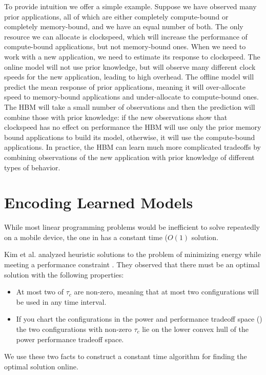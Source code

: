To provide intuition we offer a simple example.  Suppose we have
observed many prior applications, all of which are either completely
compute-bound or completely memory-bound, and we have an equal number
of both.  The only resource we can allocate is clockspeed, which will
increase the performance of compute-bound applications, but not
memory-bound ones.  When we need to work with a new application, we
need to estimate its response to clockspeed.  The online model will
not use prior knowledge, but will observe many different clock speeds
for the new application, leading to high overhead.  The offline model
will predict the mean response of prior applications, meaning it will
over-allocate speed to memory-bound applications and under-allocate to
compute-bound ones.  The HBM will take a small number of observations
and then the prediction will combine those with prior knowledge: if
the new observations show that clockspeed has no effect on performance
the HBM will use only the prior memory bound applications to build its
model, otherwise, it will use the compute-bound applications.  In
practice, the HBM can learn much more complicated tradeoffs by
combining observations of the new application with prior knowledge of
different types of behavior.

\section{Encoding Learned Models}


  While most linear programming problems would be inefficient to solve
repeatedly on a mobile device, the one in  has a
constant time ($O(1)$ solution.

Kim et al. analyzed heuristic solutions to the problem of minimizing
energy while meeting a performance constraint \cite{kim-cpsna}.  They
observed that there must be an optimal solution with the following
properties:
\begin{itemize}
\item At most two of $\tau_c$ are non-zero, meaning that at most two
  configurations will be used in any time interval.
\item If you chart the configurations in the power and performance
  tradeoff space () the two configurations with
  non-zero $\tau_c$ lie on the lower convex hull of the power
  performance tradeoff space.
\end{itemize}
We use these two facts to construct a constant time algorithm for
finding the optimal solution online.


